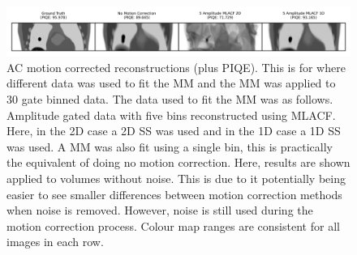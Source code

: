             \begin{figure}
                \centering
                
                \includegraphics[width=1.0\linewidth]{figures/motion_correction_2_results_2_noiseless_1d_vs_2d_visual_analysis.png}
                
                \captionsetup{singlelinecheck=false}
                \caption{
                    \gls{AC} motion corrected reconstructions (plus \gls{PIQE}). This is for where different data was used to fit the \gls{MM} and the \gls{MM} was applied to $30$ gate binned data. The data used to fit the \gls{MM} was as follows. Amplitude gated data with five bins reconstructed using \gls{MLACF}. Here, in the \gls{2D} case a \gls{2D} \gls{SS} was used and in the \gls{1D} case a \gls{1D} \gls{SS} was used. A \gls{MM} was also fit using a single bin, this is practically the equivalent of doing no motion correction. Here, results are shown applied to volumes without noise. This is due to it potentially being easier to see smaller differences between motion correction methods when noise is removed. However, noise is still used during the motion correction process. Colour map ranges are consistent for all images in each row.
                }
                
                \label{fig:evaluation_of_pet_ct_motion_correction_incorporating_motion_models_using_mlacf_and_complex_gating_schemes_results_noiseless_1d_vs_2d_visual_analysis}
            \end{figure}

